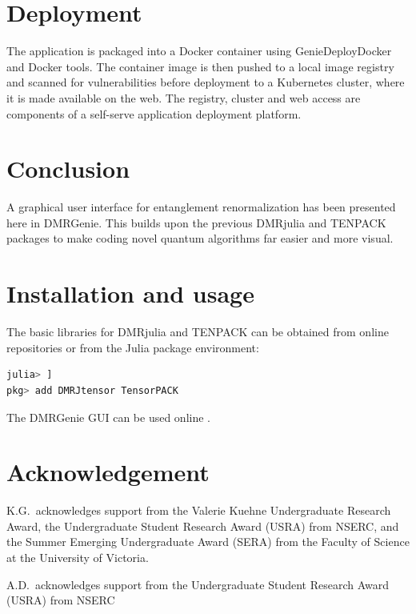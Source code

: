 \documentclass{juliacon}
\begin{document}
\section{Deployment}

The application is packaged into a Docker container using GenieDeployDocker and Docker tools.  The container image is then pushed to a local image registry and scanned for vulnerabilities before deployment to a Kubernetes cluster, where it is made available on the web.  The registry,  cluster and web access are components of a self-serve application deployment platform.

\section{Conclusion}

A graphical user interface for entanglement renormalization has been presented here in DMRGenie. This builds upon the previous DMRjulia and TENPACK packages to make coding novel quantum algorithms far easier and more visual. 

\section{Installation and usage}

The basic libraries for DMRjulia and TENPACK can be obtained from online repositories \cite{dmrjulia,tenpack} or from the Julia package environment:
\begin{lstlisting}[language = Julia]
julia> ]
pkg> add DMRJtensor TensorPACK
\end{lstlisting}

The DMRGenie GUI can be used online \cite{dmrgenie}.

\section{Acknowledgement}

K.G.~acknowledges support from the Valerie Kuehne Undergraduate Research Award, the Undergraduate Student Research Award (USRA) from NSERC, and the Summer Emerging Undergraduate Award (SERA) from the Faculty of Science at the University of Victoria. 

A.D.~acknowledges support from the Undergraduate Student Research Award (USRA) from NSERC
\end{document}
